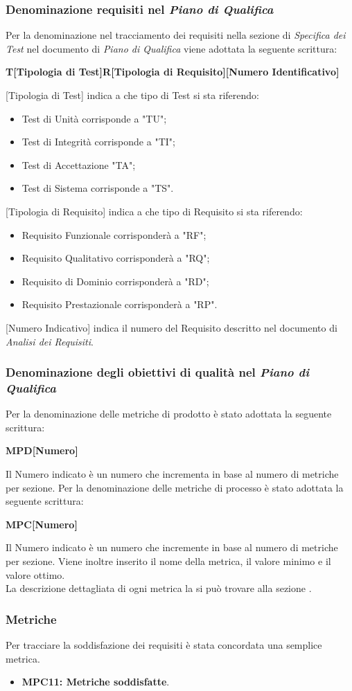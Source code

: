 \subsubsection{Denominazione requisiti nel \textit{Piano di Qualifica}}
 Per la denominazione nel tracciamento dei requisiti nella sezione di \textit{Specifica dei Test} nel documento di \textit{Piano di Qualifica} viene adottata la seguente scrittura:
 \begin{center}\textbf{T[Tipologia di Test]R[Tipologia di Requisito][Numero Identificativo]}\end{center}
 [Tipologia di Test] indica a che tipo di Test si sta riferendo:
 \begin{itemize}
 \item Test di Unità corrisponde a "TU";
 \item Test di Integrità corrisponde a "TI";
 \item Test di Accettazione "TA";
 \item Test di Sistema corrisponde a "TS".
 \end{itemize}
 [Tipologia di Requisito] indica a che tipo di Requisito si sta riferendo:
 \begin{itemize}
 \item Requisito Funzionale corrisponderà a "RF";
 \item Requisito Qualitativo corrisponderà a "RQ";
 \item Requisito di Dominio corrisponderà a "RD";
 \item Requisito Prestazionale corrisponderà a "RP".
 \end{itemize}
 [Numero Indicativo] indica il numero del Requisito descritto nel documento di \textit{Analisi dei Requisiti}.
 
\subsubsection{Denominazione degli obiettivi di qualità nel \textit{Piano di Qualifica}}
Per la denominazione delle metriche di prodotto è stato adottata la seguente scrittura:
\begin{center}\textbf{MPD[Numero]}\end{center}
Il Numero indicato è un numero che incrementa in base al numero di metriche per sezione.
Per la denominazione delle metriche di processo è stato adottata la seguente scrittura:
\begin{center}\textbf{MPC[Numero]}\end{center}
Il Numero indicato è un numero che incremente in base al numero di metriche per sezione.
Viene inoltre inserito il nome della metrica, il valore minimo e il valore ottimo.\\
La descrizione dettagliata di ogni metrica la si può trovare alla sezione .
\subsubsection{Metriche} 
Per tracciare la soddisfazione dei requisiti è stata concordata una semplice metrica.
\begin{itemize}
    \item \textbf{MPC11: Metriche soddisfatte}.
\end{itemize}
